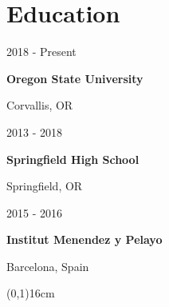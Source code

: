 \documentclass[12pt,letterpaper]{article}
\begin{document}
	\noindent
	\begin{minipage}[t]{0.5\linewidth}

	\section*{Education}
	2018 - Present
	
	\textbf{Oregon State University}

	Corvallis, OR

	\hspace{1cm}

	2013 - 2018
	
	\textbf{Springfield High School}
	
	Springfield, OR

	\hspace{1cm}

	2015 - 2016
	
	\textbf{Institut Menendez y Pelayo}
	
	Barcelona, Spain

	\hspace{1cm}

	\end{minipage}
	\begin{minipage}[t]{0.025\linewidth}
		
		\hspace{1cm}
	
	\end{minipage}
	\begin{minipage}[t][16cm][t]{0.025\linewidth}
		\hspace{1cm}
		\line(0,1){16cm}
		

	\end{minipage}
\end{document}
